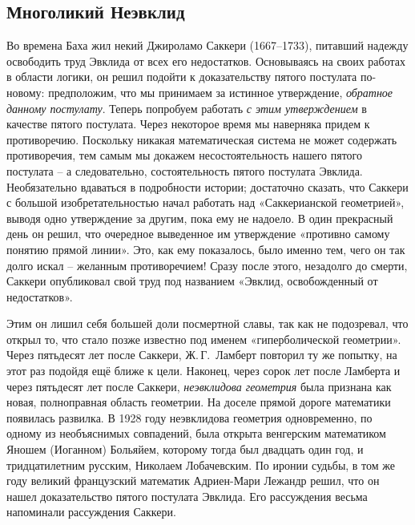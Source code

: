 \documentclass[../main.tex]{subfiles}
\begin{document}
\subsection{Многоликий Неэвклид}

Во времена Баха жил некий Джироламо Саккери (1667--1733), питавший надежду освободить труд Эвклида от всех его недостатков. Основываясь на своих работах в области логики, он решил подойти к доказательству пятого постулата по-новому: предположим, что мы принимаем за истинное утверждение, \emph{обратное данному постулату}. Теперь попробуем работать \emph{с этим утверждением} в качестве пятого постулата. Через некоторое время мы наверняка придем к противоречию. Поскольку никакая математическая система не может содержать противоречия, тем самым мы докажем несостоятельность нашего пятого постулата \--- а следовательно, состоятельность пятого постулата Эвклида. Необязательно вдаваться в подробности истории; достаточно сказать, что Саккери с большой изобретательностью начал работать над «Саккерианской геометрией», выводя одно утверждение за другим, пока ему не надоело. В один прекрасный день он решил, что очередное выведенное им утверждение «противно самому понятию прямой линии». Это, как ему показалось, было именно тем, чего он так долго искал \--- желанным противоречием! Сразу после этого, незадолго до смерти, Саккери опубликовал свой труд под названием «Эвклид, освобожденный от недостатков».

Этим он лишил себя большей доли посмертной славы, так как не подозревал, что открыл то, что стало позже известно под именем «гиперболической геометрии». Через пятьдесят лет после Саккери, Ж.\,Г.~Ламберт повторил ту же попытку, на этот раз подойдя ещё ближе к цели. Наконец, через сорок лет после Ламберта и через пятьдесят лет после Саккери, \emph{неэвклидова геометрия} была признана как новая, полноправная область геометрии. На доселе прямой дороге математики появилась развилка. В 1928 году неэвклидова геометрия одновременно, по одному из необъяснимых совпадений, была открыта венгерским математиком Яношем (Иоганном) Больяйем, которому тогда был двадцать один год, и тридцатилетним русским, Николаем Лобачевским. По иронии судьбы, в том же году великий французский математик Адриен-Мари Лежандр решил, что он нашел доказательство пятого постулата Эвклида. Его рассуждения весьма напоминали рассуждения Саккери.
\end{document}
